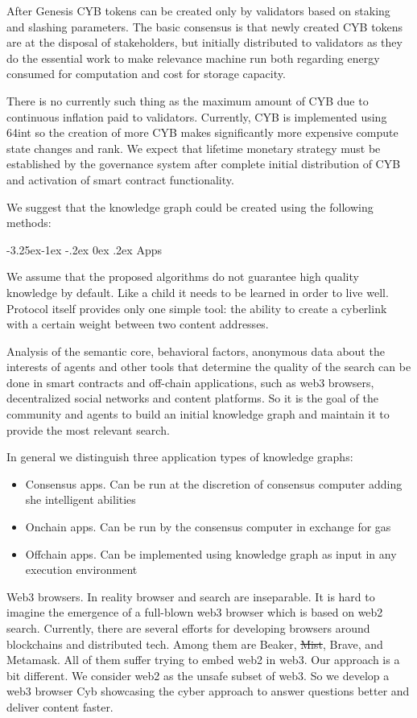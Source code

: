 \documentclass[8pt,oneside]{amsart}
\makeatletter
\renewcommand\subsection{\@startsection{subsection}{2}{\z@}%
                                     {-3.25ex\@plus -1ex \@minus -.2ex}%
                                     {0ex \@plus .2ex}%
                                     {\play\Large}}%
\newcommand{\titleSection}[1]{\subsection{#1}}
\newcommand{\code}[1]{{\PlayBold #1}}
\makeatother
\begin{document}
After Genesis CYB tokens can be created only by validators based on staking and slashing parameters. The basic consensus is that newly created CYB tokens are at the disposal of stakeholders, but initially distributed to validators as they do the essential work to make relevance machine run both regarding energy consumed for computation and cost for storage capacity.

There is no currently such thing as the maximum amount of CYB due to continuous inflation paid to validators. Currently, CYB is implemented using 64int so the creation of more CYB makes significantly more expensive compute state changes and rank. We expect that lifetime monetary strategy must be established by the governance system after complete initial distribution of CYB and activation of smart contract functionality.

We suggest that the knowledge graph could be created using the following methods:

\titleSection{Apps}\label{Applications of knowledge graph}

We assume that the proposed algorithms do not guarantee high quality knowledge by default. Like a child it needs to be learned in order to live well. Protocol itself provides only one simple tool: the ability to create a cyberlink with a certain weight between two content addresses.

Analysis of the semantic core, behavioral factors, anonymous data about the interests of agents and other tools that determine the quality of the search can be done in smart contracts and off-chain applications, such as web3 browsers, decentralized social networks and content platforms. So it is the goal of the community and agents to build an initial knowledge graph and maintain it to provide the most relevant search.

In general we distinguish three application types of knowledge graphs:
\begin{itemize}
\item Consensus apps. Can be run at the discretion of consensus computer adding she intelligent abilities
\item Onchain apps. Can be run by the consensus computer in exchange for gas
\item Offchain apps. Can be implemented using knowledge graph as input in any execution environment
\end{itemize}

\code{Web3 browsers}. In reality browser and search are inseparable. It is hard to imagine the emergence of a full-blown web3 browser which is based on web2 search. Currently, there are several efforts for developing browsers around blockchains and distributed tech. Among them are Beaker, \sout{Mist}, Brave, and Metamask. All of them suffer trying to embed web2 in web3. Our approach is a bit different. We consider web2 as the unsafe subset of web3. So we develop a web3 browser Cyb showcasing the cyber approach to answer questions better and deliver content faster.
\end{document}
